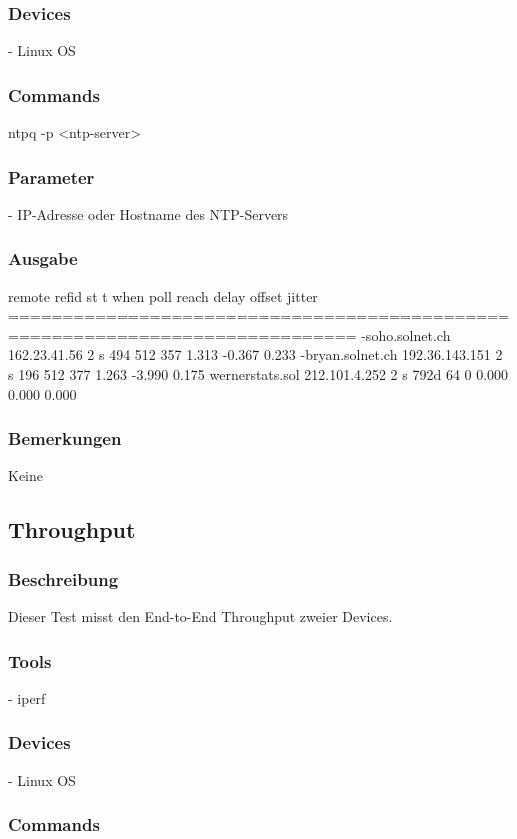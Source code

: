\documentclass[a4,12pt]{scrartcl}
\begin{document}
\subsubsection{Devices}
- Linux OS
\subsubsection{Commands}
ntpq -p <ntp-server>
\subsubsection{Parameter}
- IP-Adresse oder Hostname des NTP-Servers
\subsubsection{Ausgabe}
     remote           refid      st t when poll reach   delay   offset  jitter\newline
==============================================================================\newline
-soho.solnet.ch  162.23.41.56     2 s  494  512  357    1.313   -0.367   0.233\newline
-bryan.solnet.ch 192.36.143.151   2 s  196  512  377    1.263   -3.990   0.175\newline
 wernerstats.sol 212.101.4.252    2 s 792d   64    0    0.000    0.000   0.000\newline \subsubsection{Bemerkungen}
Keine

\subsection{Throughput}
\subsubsection{Beschreibung}
Dieser Test misst den End-to-End Throughput zweier Devices.
\subsubsection{Tools}
- iperf
\subsubsection{Devices}
- Linux OS
\subsubsection{Commands}
\end{document}
